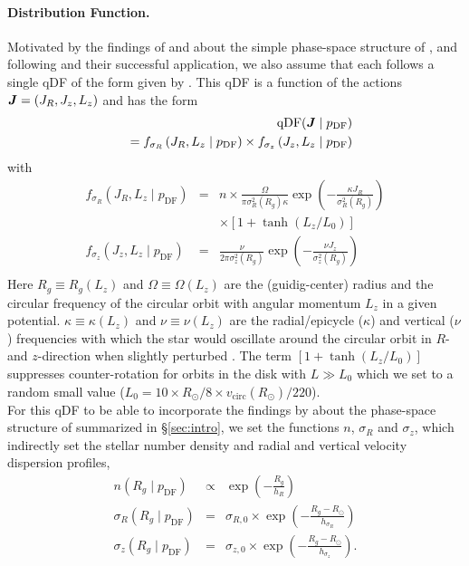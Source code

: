 \paragraph{Distribution Function.} Motivated by the findings of \citet{bov12b,bov12c,bov12d} and \citet{tin13} about the simple phase-space structure of \MAPs, and following \citet{bov13} and their successful application, we also assume that each \MAP follows a single qDF of the form given by \citet{bin11}.  This qDF  is a function of the actions $\boldsymbol{J}=(J_R,J_z,L_z)$ and has the form
\begin{eqnarray}
&&\text{qDF}(\boldsymbol{J} \mid p_\text{DF}) \nonumber\\
&&= f_{\sigma_R}\left(J_R,L_z \mid p_\text{DF}\right) \times f_{\sigma_z}\left(J_z,L_z \mid p_\text{DF}\right)\label{eq:df_general}\end{eqnarray}
with
\begin{eqnarray}
f_{\sigma_R}\left(J_R,L_z \mid p_\text{DF}\right) &=& n \times \frac{\Omega}{\pi\sigma_R^2(R_g) \kappa}\exp\left(-\frac{\kappa J_R}{\sigma_R^2(R_g)} \right) \nonumber\\
&& \times \left[1+\tanh\left(L_z/L_0\right) \right]\\
f_{\sigma_z}\left(J_z,L_z \mid p_\text{DF} \right) &=& \frac{\nu}{2 \pi \sigma_z^2(R_g)} \exp\left( -\frac{\nu J_z}{\sigma_z^2(R_g)} \right) \\
\end{eqnarray}
Here $R_g \equiv R_g(L_z)$ and $\Omega\equiv \Omega(L_z)$ are the (guidig-center) radius and the circular frequency of the circular orbit with angular momentum $L_z$ in a given potential. $\kappa\equiv \kappa(L_z)$ and $\nu\equiv \nu(L_z)$ are the radial/epicycle ($\kappa$) and vertical ($\nu$) frequencies with which the star would oscillate around the circular orbit in $R$- and $z$-direction when slightly perturbed \citep{bin08}. The term $\left[1+\tanh\left(L_z/L_0\right) \right]$ suppresses counter-rotation for orbits in the disk with $L \gg L_0$ which we set to a random small value ($L_0 = 10 \times R_\odot/8 \times v_\text{circ}(R_\odot)/220$).
\\For this qDF to be able to incorporate the findings by \cite{bov12b,bov12b,bov12c} about the phase-space structure of \MAPs summarized in \S\ref{sec:intro}, we set the functions $n$,  $\sigma_R$ and $\sigma_z$, which indirectly set the stellar number density and radial and vertical velocity dispersion profiles,
\begin{eqnarray}
n(R_g \mid p_\text{DF}) &\propto& \exp\left(-\frac{R_g}{h_R} \right)\\
\sigma_R(R_g \mid p_\text{DF}) &=& \sigma_{R,0} \times \exp\left(- \frac{R_g-R_\odot}{h_{\sigma_R}} \right)\label{eq:sigmaRRg}\\
\sigma_z(R_g \mid p_\text{DF}) &=& \sigma_{z,0} \times \exp\left(- \frac{R_g-R_\odot}{h_{\sigma_z}} \right)\label{eq:sigmazRg}.
\end{eqnarray}
